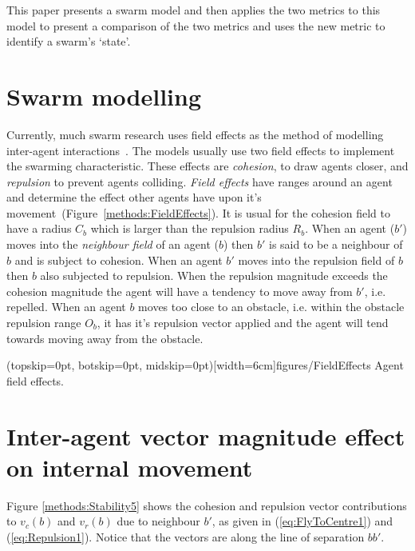 \documentclass{ieeeaccess}
\begin{document}
This paper presents a swarm model and then applies the two metrics to this model to present a comparison of the two metrics and uses the new metric to identify a swarm's `state'.
 
\section{Swarm modelling}\label{SwarmModelling}
Currently, much swarm research uses field effects as the method of modelling inter-agent interactions~\cite{BAF:06, BAFVM:06, BM:09, APZDAMC:09, GP:02, GP:04, GP:04a, GP:05, GP:11, MYP:09}. The models usually use two field effects to implement the swarming characteristic. These effects are \emph{cohesion}, to draw agents closer, and \emph{repulsion} to prevent agents colliding. \emph{Field effects} have ranges around an agent and determine the effect other agents have upon it's movement~(Figure~\ref{methods:FieldEffects}). It is usual for the cohesion field to have a radius $C_b$ which is larger than the repulsion radius $R_b$. When an agent ($b'$) moves into the \emph{neighbour field} of an agent ($b$) then $b'$ is said to be a neighbour of $b$ and is subject to cohesion. When an agent $b'$ moves into the repulsion field of $b$ then $b$ also subjected to repulsion. When the repulsion magnitude exceeds the cohesion magnitude the agent will have a tendency to move away from $b'$, i.e. repelled. When an agent $b$ moves too close to an obstacle, i.e. within the obstacle repulsion range $O_b$, it has it's repulsion vector applied and the agent will tend towards moving away from the obstacle.

\Figure[t!](topskip=0pt, botskip=0pt, midskip=0pt)[width=6cm]{figures/FieldEffects}
{Agent field effects.\label{methods:FieldEffects}}


\section{Inter-agent vector magnitude effect on internal movement}\label{Section:StabilityMagnitude}
Figure \ref{methods:Stability5} shows the cohesion and repulsion vector contributions to $v_c(b)$ and $v_r(b)$ due to neighbour $b'$, as given in (\ref{eq:FlyToCentre1}) and (\ref{eq:Repulsion1}). Notice that the vectors are along the line of separation $bb'$. \\
\end{document}
